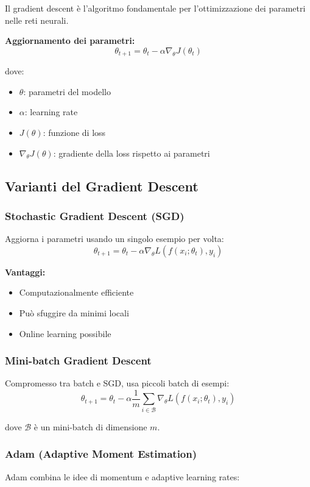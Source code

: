 \documentclass[12pt,a4paper,twoside]{report}
\begin{document}
Il gradient descent è l'algoritmo fondamentale per l'ottimizzazione dei parametri nelle reti neurali.

\textbf{Aggiornamento dei parametri:}
$$\theta_{t+1} = \theta_t - \alpha \nabla_\theta J(\theta_t)$$

dove:
\begin{itemize}
    \item $\theta$: parametri del modello
    \item $\alpha$: learning rate
    \item $J(\theta)$: funzione di loss
    \item $\nabla_\theta J(\theta)$: gradiente della loss rispetto ai parametri
\end{itemize}

\subsection{Varianti del Gradient Descent}

\subsubsection{Stochastic Gradient Descent (SGD)}
Aggiorna i parametri usando un singolo esempio per volta:
$$\theta_{t+1} = \theta_t - \alpha \nabla_\theta L(f(x_i; \theta_t), y_i)$$

\textbf{Vantaggi:}
\begin{itemize}
    \item Computazionalmente efficiente
    \item Può sfuggire da minimi locali
    \item Online learning possibile
\end{itemize}

\subsubsection{Mini-batch Gradient Descent}
Compromesso tra batch e SGD, usa piccoli batch di esempi:
$$\theta_{t+1} = \theta_t - \alpha \frac{1}{m} \sum_{i \in \mathcal{B}} \nabla_\theta L(f(x_i; \theta_t), y_i)$$

dove $\mathcal{B}$ è un mini-batch di dimensione $m$.

\subsubsection{Adam (Adaptive Moment Estimation)}
Adam combina le idee di momentum e adaptive learning rates:
\end{document}

